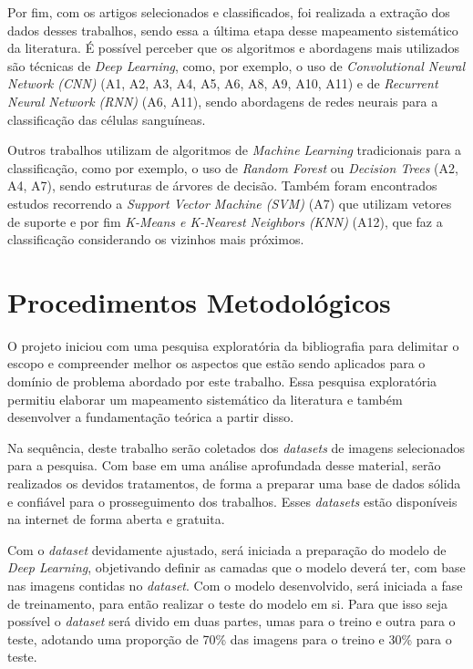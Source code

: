 Por fim, com os artigos selecionados e classificados, foi realizada a extração dos dados desses trabalhos, sendo essa a última etapa desse mapeamento sistemático da literatura. É possível perceber que os algoritmos e abordagens mais utilizados são técnicas de \emph{Deep Learning}, como, por exemplo, o uso de \emph{Convolutional Neural Network (CNN)} (A1, A2, A3, A4, A5, A6, A8, A9, A10, A11) e de \emph{Recurrent Neural Network (RNN)} (A6, A11), sendo abordagens de redes neurais para a classificação das células sanguíneas.

Outros trabalhos utilizam de algoritmos de \emph{Machine Learning} tradicionais para a classificação, como por exemplo, o uso de \emph{Random Forest} ou \emph{Decision Trees}  (A2, A4, A7), sendo estruturas de árvores de decisão. Também foram encontrados estudos recorrendo a \emph{Support Vector Machine (SVM)} (A7) que utilizam vetores de suporte e por fim \emph{K-Means e K-Nearest Neighbors (KNN)} (A12), que faz a classificação considerando os vizinhos mais próximos.

\chapter{Procedimentos Metodológicos}
\label{chap:metodologia}


O projeto iniciou com uma pesquisa exploratória da bibliografia para delimitar o escopo e compreender melhor os aspectos que estão sendo aplicados para o domínio de problema abordado por este trabalho. Essa pesquisa exploratória permitiu elaborar um mapeamento sistemático da literatura e também desenvolver a fundamentação teórica a partir disso.

Na sequência, deste trabalho serão coletados dos \emph{datasets} de imagens selecionados para a pesquisa. Com base em uma análise aprofundada desse material, serão realizados os devidos tratamentos, de forma a preparar uma base de dados sólida e confiável para o prosseguimento dos trabalhos. Esses \emph{datasets} estão disponíveis na internet de forma aberta e gratuita.

Com o \emph{dataset} devidamente ajustado, será iniciada a preparação do modelo de \emph{Deep Learning}, objetivando definir as camadas que o modelo deverá ter, com base nas imagens contidas no \emph{dataset}. Com o modelo desenvolvido, será iniciada a fase de treinamento, para então realizar o teste do modelo em si. Para que isso seja possível o \emph{dataset} será divido em duas partes, umas para o treino e outra para o teste, adotando uma proporção de 70\% das imagens para o treino e 30\% para o teste.

